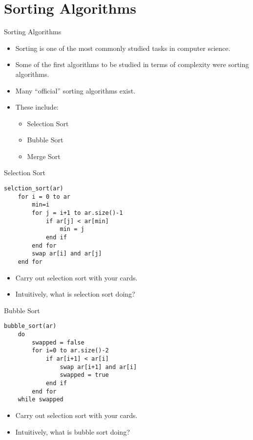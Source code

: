\documentclass[]{beamer}
\begin{document}
\section{Sorting Algorithms}
\begin{frame}{Sorting Algorithms}
\begin{itemize}[<+->]
    \item Sorting is one of the most commonly studied tasks in
        computer science.
    \item Some of the first algorithms to be studied in terms of
        complexity were sorting algorithms.
    \item Many ``official'' sorting algorithms exist.
    \item These include:
    \begin{itemize}
        \item Selection Sort
        \item Bubble Sort
        \item Merge Sort
    \end{itemize}
\end{itemize}
\end{frame}

\begin{frame}[fragile]{Selection Sort}
\begin{verbatim}
selction_sort(ar)
    for i = 0 to ar
        min=i
        for j = i+1 to ar.size()-1
            if ar[j] < ar[min] 
                min = j
            end if
        end for
        swap ar[i] and ar[j]
    end for
\end{verbatim}
\begin{itemize}[<+->]
    \item Carry out selection sort with your cards.
    \item Intuitively, what is selection sort doing?
\end{itemize}
\end{frame}

\begin{frame}[fragile]{Bubble Sort}
\begin{verbatim}
bubble_sort(ar)
    do
        swapped = false
        for i=0 to ar.size()-2
            if ar[i+1] < ar[i]
                swap ar[i+1] and ar[i]
                swapped = true
            end if
        end for
    while swapped
\end{verbatim}
\begin{itemize}[<+->]
    \item Carry out selection sort with your cards.
    \item Intuitively, what is bubble sort doing?
\end{itemize}
\end{frame}
\end{document}
